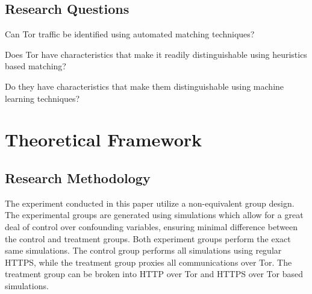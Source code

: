 \documentclass{ecuthesis}
\begin{document}


\section{Research Questions}

\begin{enumerate*}
  \item Can Tor traffic be identified using automated matching techniques?
  \item Does Tor have characteristics that make it readily distinguishable using
    heuristics based matching?
  \item Do they have characteristics that make them distinguishable using
    machine learning techniques?
\end{enumerate*}

\chapter{Theoretical Framework}

\section{Research Methodology}

The experiment conducted in this paper utilize a non-equivalent group design.
The experimental groups are generated using simulations which allow for a great
deal of control over confounding variables, ensuring minimal difference between
the control and treatment groups. Both experiment groups perform the exact same
simulations. The control group performs all simulations using regular HTTPS,
while the treatment group proxies all communications over Tor. The treatment
group can be broken into HTTP over Tor and HTTPS over Tor based simulations.
\end{document}
